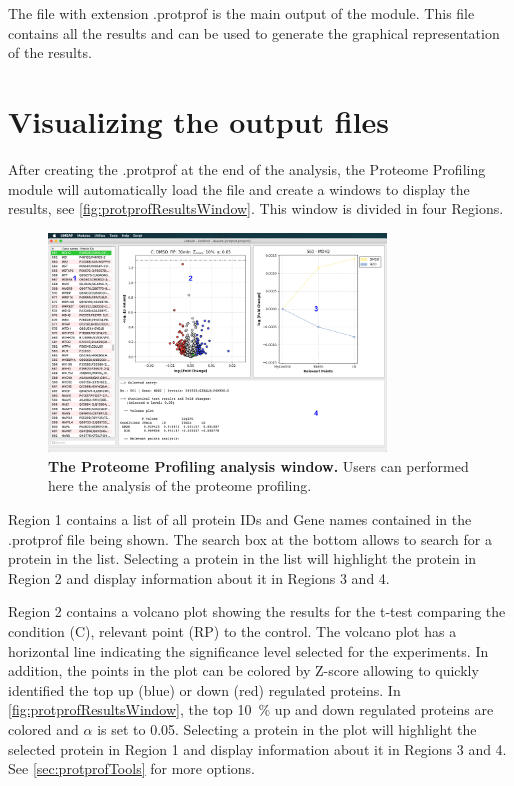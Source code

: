 The file with extension .protprof is the main output of the module. This file contains all the results and can be used to generate the graphical representation of the results.    

\section{Visualizing the output files}

After creating the .protprof at the end of the analysis, the Proteome Profiling module will automatically load the file and create a windows to display the results, see \autoref{fig:protprofResultsWindow}. This window is divided in four Regions. 

\begin{figure}[h]
	\centering
	\includegraphics[width=0.8\textwidth]{./IMAGES/MOD-PROTPROF/protprof-frag.jpg}	    
	\caption[The Proteome Profiling analysis window]{\textbf{The Proteome Profiling analysis window.} Users can performed here the analysis of the proteome profiling.} 
	\label{fig:protprofResultsWindow}
	\vspace{-5pt} 	
\end{figure}

Region \num{1} contains a list of all protein IDs and Gene names contained in the .protprof file being shown. The search box at the bottom allows to search for a protein in the list. Selecting a protein in the list will highlight the protein in Region \num{2} and display information about it in Regions \num{3} and \num{4}.

Region \num{2} contains a volcano plot showing the results for the t-test comparing the condition (C), relevant point (RP) to the control. The volcano plot has a horizontal line indicating the significance level selected for the experiments. In addition, the points in the plot can be colored by Z-score allowing to quickly identified the top up (blue) or down (red) regulated proteins. In \autoref{fig:protprofResultsWindow}, the top \SI{10}{\percent} up and down regulated proteins are colored and $\alpha$ is set to 0.05. Selecting a protein in the plot will highlight the selected protein in Region \num{1} and display information about it in Regions \num{3} and \num{4}. See \autoref{sec:protprofTools} for more options.

